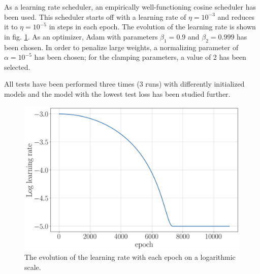 As a learning rate scheduler, an empirically well-functioning cosine scheduler has been used. This scheduler starts off with a learning rate of $\eta = 10^{-3}$ and reduces it to $\eta = 10^{-5}$ in steps in each epoch. The evolution of the learning rate is shown in fig. \ref{fig:lr}. As an optimizer, Adam with parameters $\beta_1 = 0.9$ and $\beta_2 = 0.999$ has been chosen. In order to penalize large weights, a normalizing parameter of $\alpha = 10^{-5}$ has been chosen; for the clamping parameters, a value of 2 has been selected.

All tests have been performed three times (3 runs) with differently initialized models and the model with the lowest test loss has been studied further.

\begin{figure}[h!]
	\centering
	\includegraphics[width=0.6\linewidth]{figures/network_setup/lr}
	\caption{The evolution of the learning rate with each epoch on a logarithmic scale.}
	\label{fig:lr}
\end{figure}
